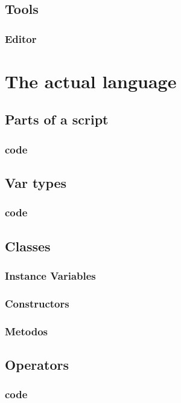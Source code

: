 \documentclass[10pt]{book}
\begin{document}
\section{Tools}
\lipsum[15]
\subsection{Editor}
\lipsum[16]

%
\chapter{The actual language}
\lipsum[16]

\section{Parts of a script}
\lipsum[17]
\subsection{code}
\lipsum[18]

\section{Var types}
\lipsum[19]
\subsection{code}
\lipsum[20]

\section{Classes}
\lipsum[21]
\subsection{Instance Variables}
\lipsum[22]
\subsection{Constructors}
\lipsum[23]
\subsection{Metodos}
\lipsum[24]

\section{Operators}
\lipsum[25]
\subsection{code}
\lipsum[26]
\end{document}

